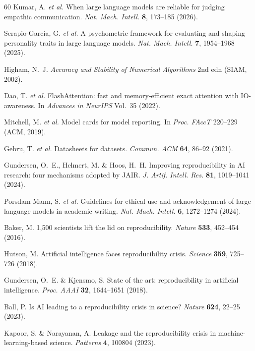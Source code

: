 \documentclass[sn-nature]{sn-jnl}
\begin{document}
\begin{thebibliography}{60}
Kumar, A. \emph{et al.}
When large language models are reliable for judging empathic communication.
\emph{Nat. Mach. Intell.} \textbf{8}, 173--185 (2026).

Serapio-Garc\'{i}a, G. \emph{et al.}
A psychometric framework for evaluating and shaping personality traits in large language models.
\emph{Nat. Mach. Intell.} \textbf{7}, 1954--1968 (2025).

Higham, N.~J.
\emph{Accuracy and Stability of Numerical Algorithms} 2nd edn (SIAM, 2002).

Dao, T. \emph{et al.}
FlashAttention: fast and memory-efficient exact attention with IO-awareness.
In \emph{Advances in NeurIPS} Vol.~35 (2022).

Mitchell, M. \emph{et al.}
Model cards for model reporting.
In \emph{Proc. FAccT} 220--229 (ACM, 2019).

Gebru, T. \emph{et al.}
Datasheets for datasets.
\emph{Commun. ACM} \textbf{64}, 86--92 (2021).

Gundersen, O.~E., Helmert, M. \& Hoos, H.~H.
Improving reproducibility in AI research: four mechanisms adopted by JAIR.
\emph{J. Artif. Intell. Res.} \textbf{81}, 1019--1041 (2024).

Porsdam Mann, S. \emph{et al.}
Guidelines for ethical use and acknowledgement of large language models in academic writing.
\emph{Nat. Mach. Intell.} \textbf{6}, 1272--1274 (2024).

Baker, M.
1,500 scientists lift the lid on reproducibility.
\emph{Nature} \textbf{533}, 452--454 (2016).

Hutson, M.
Artificial intelligence faces reproducibility crisis.
\emph{Science} \textbf{359}, 725--726 (2018).

Gundersen, O.~E. \& Kjensmo, S.
State of the art: reproducibility in artificial intelligence.
\emph{Proc. AAAI} \textbf{32}, 1644--1651 (2018).

Ball, P.
Is AI leading to a reproducibility crisis in science?
\emph{Nature} \textbf{624}, 22--25 (2023).

Kapoor, S. \& Narayanan, A.
Leakage and the reproducibility crisis in machine-learning-based science.
\emph{Patterns} \textbf{4}, 100804 (2023).


\end{thebibliography}
\end{document}
